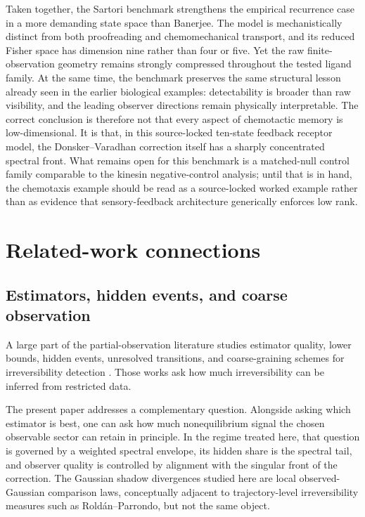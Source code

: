 \documentclass[11pt,a4paper]{article}
\numberwithin{equation}{section}
\theoremstyle{thmcompact}
\theoremstyle{remark}
\begin{document}
Taken together, the Sartori benchmark strengthens the empirical recurrence case in a more demanding state space than Banerjee. The model is mechanistically distinct from both proofreading and chemomechanical transport, and its reduced Fisher space has dimension nine rather than four or five. Yet the raw finite-observation geometry remains strongly compressed throughout the tested ligand family. At the same time, the benchmark preserves the same structural lesson already seen in the earlier biological examples: detectability is broader than raw visibility, and the leading observer directions remain physically interpretable. The correct conclusion is therefore not that every aspect of chemotactic memory is low-dimensional. It is that, in this source-locked ten-state feedback receptor model, the Donsker--Varadhan correction itself has a sharply concentrated spectral front. What remains open for this benchmark is a matched-null control family comparable to the kinesin negative-control analysis; until that is in hand, the chemotaxis example should be read as a source-locked worked example rather than as evidence that sensory-feedback architecture generically enforces low rank.


\section{Related-work connections}
\label{sec:related-work-connections}

\subsection{Estimators, hidden events, and coarse observation}

A large part of the partial-observation literature studies estimator quality, lower bounds, hidden events, unresolved transitions, and coarse-graining schemes for irreversibility detection \cite{BaiesiNishiyamaFalasco2023,BlomSongVougaGodecMakarov2025,FritzErtelSeifert2024,Harunari2024,vanderMeerSaito2025,ErtelSeifert2025,Ehrich2021,DeguntherVanDerMeerSeifert2024,MeybergDeguntherSeifert2024,RoldanParrondo2012}. Those works ask how much irreversibility can be inferred from restricted data.

The present paper addresses a complementary question. Alongside asking which estimator is best, one can ask how much nonequilibrium signal the chosen observable sector can retain in principle. In the regime treated here, that question is governed by a weighted spectral envelope, its hidden share is the spectral tail, and observer quality is controlled by alignment with the singular front of the correction. The Gaussian shadow divergences studied here are local observed-Gaussian comparison laws, conceptually adjacent to trajectory-level irreversibility measures such as Rold\'an--Parrondo, but not the same object.
\end{document}
